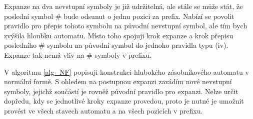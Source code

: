 Expanze na dva nevstupní symboly je již udržitelná, ale stále se může stát, že poslední symbol $\#$ bude odsunut o jednu pozici za prefix. Nabízí se povolit pravidlo pro přepis tohoto symbolu na původní nevstupní symbol, ale tím bych zvýšila hloubku automatu. Místo toho spojuji krok expanze a krok přepisu posledního $\#$ symbolu na původní symbol do jednoho pravidla typu (iv). Expanze tak nemá vliv na $\#$ symboly v prefixu.

V algoritmu \ref{alg_NF} popisuji konstrukci hlubokého zásobníkového automatu v normální formě. S ohledem na postupnou expanzi zavádím nové nevstupní symboly, jejichž součástí je rovněž původní pravidlo pro expanzi. Nelze určit dopředu, kdy se jednotlivé kroky expanze provedou, proto je nutné je umožnit provést ve všech stavech automatu a na všech pozicích v prefixu. 

